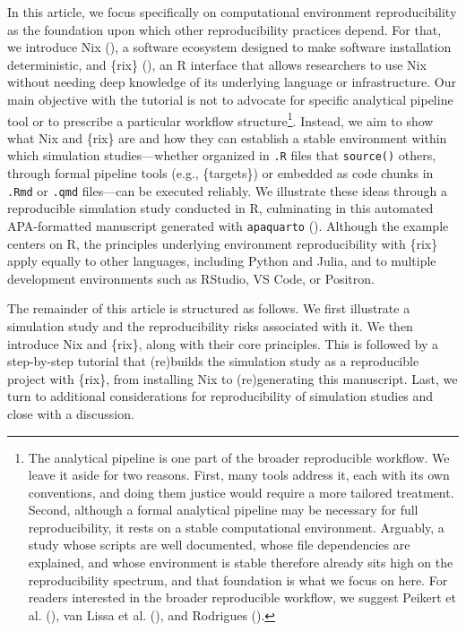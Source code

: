 \documentclass[
  man,
  longtable,
  nolmodern,
  notxfonts,
  notimes,
  colorlinks=true,linkcolor=blue,citecolor=blue,urlcolor=blue]{apa7}
\begin{document}
In this article, we focus specifically on computational environment
reproducibility as the foundation upon which other reproducibility
practices depend. For that, we introduce Nix
(), a software
ecosystem designed to make software installation deterministic, and
\{rix\} (), an R interface that allows researchers to use Nix without
needing deep knowledge of its underlying language or infrastructure. Our
main objective with the tutorial is not to advocate for specific
analytical pipeline tool or to prescribe a particular workflow
structure\footnote{The analytical pipeline is one part of the broader
  reproducible workflow. We leave it aside for two reasons. First, many
  tools address it, each with its own conventions, and doing them
  justice would require a more tailored treatment. Second, although a
  formal analytical pipeline may be necessary for full reproducibility,
  it rests on a stable computational environment. Arguably, a study
  whose scripts are well documented, whose file dependencies are
  explained, and whose environment is stable therefore already sits high
  on the reproducibility spectrum, and that foundation is what we focus
  on here. For readers interested in the broader reproducible workflow,
  we suggest Peikert et al. (),
  van Lissa et al. (), and
  Rodrigues ().}. Instead, we aim to
show what Nix and \{rix\} are and how they can establish a stable
environment within which simulation studies---whether organized in
\texttt{.R} files that \texttt{source()} others, through formal pipeline
tools (e.g., \{targets\}) or embedded as code chunks in \texttt{.Rmd} or
\texttt{.qmd} files---can be executed reliably. We illustrate these
ideas through a reproducible simulation study conducted in R,
culminating in this automated APA-formatted manuscript generated with
\texttt{apaquarto} ().
Although the example centers on R, the principles underlying environment
reproducibility with \{rix\} apply equally to other languages, including
Python and Julia, and to multiple development environments such as
RStudio, VS Code, or Positron.

The remainder of this article is structured as follows. We first
illustrate a simulation study and the reproducibility risks associated
with it. We then introduce Nix and \{rix\}, along with their core
principles. This is followed by a step-by-step tutorial that (re)builds
the simulation study as a reproducible project with \{rix\}, from
installing Nix to (re)generating this manuscript. Last, we turn to
additional considerations for reproducibility of simulation studies and
close with a discussion.
\end{document}

